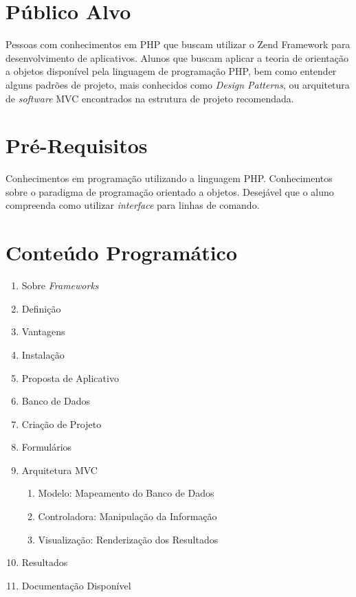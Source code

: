 \documentclass{article}
\begin{document}
\section{Público Alvo}
\label{sec:publico-alvo}

Pessoas com conhecimentos em PHP que buscam utilizar o Zend Framework para
desenvolvimento de aplicativos. Alunos que buscam aplicar a teoria de orientação
a objetos disponível pela linguagem de programação PHP, bem como entender alguns
padrões de projeto, mais conhecidos como \emph{Design Patterns}, ou arquitetura
de \emph{software} MVC encontrados na estrutura de projeto recomendada.

\section{Pré-Requisitos}
\label{sec:pre-requisitos}

Conhecimentos em programação utilizando a linguagem PHP. Conhecimentos sobre o
paradigma de programação orientado a objetos. Desejável que o aluno compreenda
como utilizar \emph{interface} para linhas de comando.

\section{Conteúdo Programático}
\label{sec:conteudo-programatico}

\begin{enumerate}
    \item Sobre \emph{Frameworks}
    \item Definição
    \item Vantagens
    \item Instalação
    \item Proposta de Aplicativo
    \item Banco de Dados
    \item Criação de Projeto
    \item Formulários
    \item Arquitetura MVC
    \begin{enumerate}
        \item Modelo: Mapeamento do Banco de Dados
        \item Controladora: Manipulação da Informação
        \item Visualização: Renderização dos Resultados
    \end{enumerate}
    \item Resultados
    \item Documentação Disponível
\end{enumerate}
\end{document}
